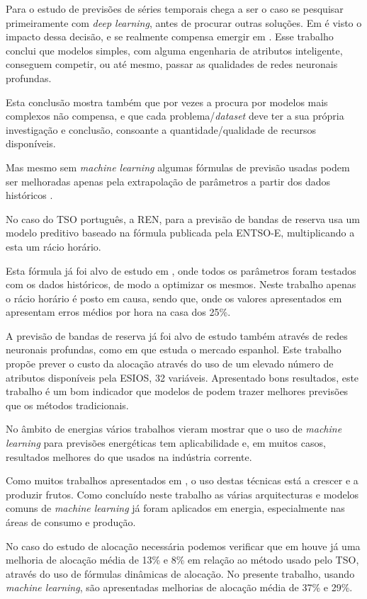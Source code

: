 Para o estudo de previsões de séries temporais chega a ser o caso se pesquisar primeiramente com \textit{deep learning}, antes de procurar outras soluções. Em \cite{Elsayed} é visto o impacto dessa decisão, e se realmente compensa emergir em . Esse trabalho conclui que modelos simples, com alguma engenharia de atributos inteligente, conseguem competir, ou até mesmo, passar as qualidades de redes neuronais profundas.\par
Esta conclusão mostra também que por vezes a procura por modelos mais complexos não compensa, e que cada problema/\textit{dataset} deve ter a sua própria investigação e conclusão, consoante a quantidade/qualidade de recursos disponíveis.\par
Mas mesmo sem \textit{machine learning} algumas fórmulas de previsão usadas podem ser melhoradas apenas pela extrapolação de parâmetros a partir dos dados históricos \cite{Algarvio2024}.\par  
No caso do \gls{TSO} português, a \gls{REN}, para a previsão de bandas de reserva usa um modelo preditivo baseado na fórmula publicada pela \gls{ENTSO-E}, multiplicando a esta um rácio horário.\par
Esta fórmula já foi alvo de estudo em \cite{Carneiro2016}, onde todos os parâmetros foram testados com os dados históricos, de modo a optimizar os mesmos. Neste trabalho apenas o rácio horário é posto em causa, sendo que, onde os valores apresentados em \cite{Carneiro2016} apresentam erros médios por hora na casa dos 25\%.\par
A previsão de bandas de reserva já foi alvo de estudo também através de redes neuronais profundas, como em \cite{miota2023} que estuda o mercado espanhol. Este trabalho propõe prever o custo da alocação através do uso de um elevado número de atributos disponíveis pela \gls{ESIOS}, 32 variáveis. Apresentado bons resultados, este trabalho é um bom indicador que modelos de  podem trazer melhores previsões que os métodos tradicionais.\par


No âmbito de energias vários trabalhos vieram mostrar que o uso de \textit{machine learning} para previsões energéticas tem aplicabilidade \cite{Stassen} e, em muitos casos, resultados melhores do que usados na indústria corrente. \cite{Ahmad2020, Antonopoulos2020} \par
Como muitos trabalhos apresentados em \cite{Benti2023}, o uso destas técnicas está a crescer e a produzir frutos. Como concluído neste trabalho as várias arquitecturas e modelos comuns de \textit{machine learning} já foram aplicados em energia, especialmente nas áreas de consumo e produção.\par
No caso do estudo de alocação necessária podemos verificar que em \cite{Algarvio2024} houve já uma melhoria de alocação média de 13\% e 8\% em relação ao método usado pelo \gls{TSO}, através do uso de fórmulas dinâmicas de alocação. No presente trabalho, usando \textit{machine learning}, são apresentadas melhorias de alocação média de 37\% e 29\%.\par






